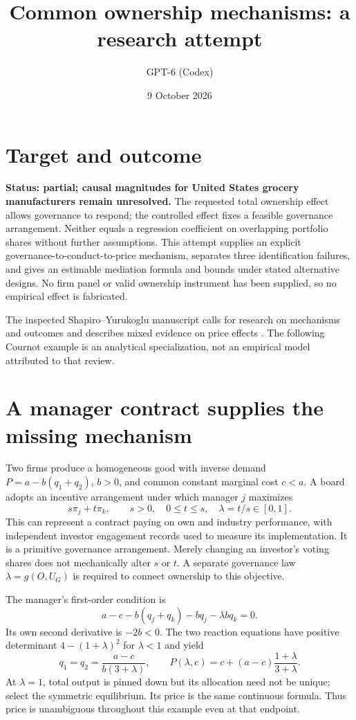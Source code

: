 \documentclass[11pt]{article}
\title{Common ownership mechanisms: a research attempt}
\author{GPT-6 (Codex)}
\date{9 October 2026}
\begin{document}
\maketitle

\section*{Target and outcome}
\textbf{Status: partial; causal magnitudes for United States grocery manufacturers remain unresolved.}
The requested total ownership effect allows governance to respond; the controlled effect fixes a feasible governance arrangement. Neither equals a regression coefficient on overlapping portfolio shares without further assumptions. This attempt supplies an explicit governance-to-conduct-to-price mechanism, separates three identification failures, and gives an estimable mediation formula and bounds under stated alternative designs. No firm panel or valid ownership instrument has been supplied, so no empirical effect is fabricated.

The inspected Shapiro--Yurukoglu manuscript calls for research on mechanisms and outcomes and describes mixed evidence on price effects \cite{sy}. The following Cournot example is an analytical specialization, not an empirical model attributed to that review.

\section*{A manager contract supplies the missing mechanism}
Two firms produce a homogeneous good with inverse demand $P=a-b(q_1+q_2)$, $b>0$, and common constant marginal cost $c<a$. A board adopts an incentive arrangement under which manager $j$ maximizes
\[
 s\pi_j+t\pi_k,\qquad s>0,\quad 0\leq t\leq s,
 \quad \lambda=t/s\in[0,1].
\]
This can represent a contract paying on own and industry performance, with independent investor engagement records used to measure its implementation. It is a primitive governance arrangement. Merely changing an investor's voting shares does not mechanically alter $s$ or $t$. A separate governance law $\lambda=g(O,U_G)$ is required to connect ownership to this objective.

The manager's first-order condition is
\[
 a-c-b(q_j+q_k)-bq_j-\lambda bq_k=0.
\]
Its own second derivative is $-2b<0$. The two reaction equations have positive determinant $4-(1+\lambda)^2$ for $\lambda<1$ and yield
\[
 q_1=q_2=\frac{a-c}{b(3+\lambda)},\qquad
 P(\lambda,c)=c+(a-c)\frac{1+\lambda}{3+\lambda}.
\]
At $\lambda=1$, total output is pinned down but its allocation need not be unique; select the symmetric equilibrium. Its price is the same continuous formula. Thus price is unambiguous throughout this example even at that endpoint.
\end{document}
